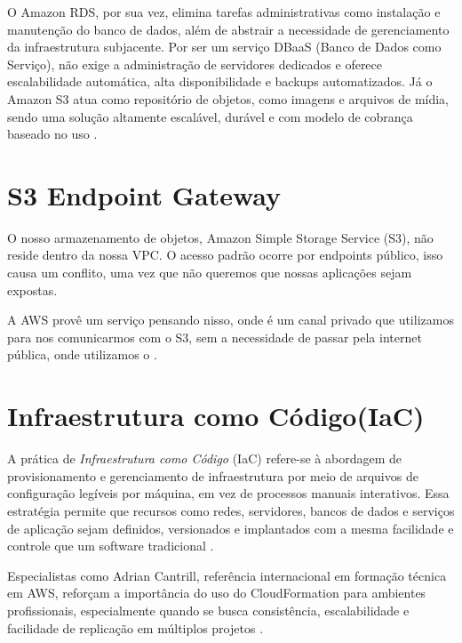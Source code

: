 O Amazon RDS, por sua vez, elimina tarefas administrativas como instalação e manutenção do banco de dados, além de abstrair a necessidade de gerenciamento da infraestrutura subjacente. Por ser um serviço DBaaS (Banco de Dados como Serviço), não exige a administração de servidores dedicados e oferece escalabilidade automática, alta disponibilidade e backups automatizados. Já o Amazon S3 atua como repositório de objetos, como imagens e arquivos de mídia, sendo uma solução altamente escalável, durável e com modelo de cobrança baseado no uso \cite{awsdocs2024}.

\section{S3 Endpoint Gateway}
O nosso armazenamento de objetos, Amazon Simple Storage Service (S3), não reside dentro da nossa VPC. O acesso padrão ocorre por endpoints público, isso causa um conflito, uma vez que não queremos que nossas aplicações sejam expostas.

A AWS provê um serviço pensando nisso, onde é um canal privado que utilizamos para nos comunicarmos com o S3, sem a necessidade de passar pela internet pública, onde utilizamos o \cite{awsendpoint}.
 

\section{Infraestrutura como Código(IaC)}A prática de \textit{Infraestrutura como Código} (IaC) refere-se à abordagem de provisionamento e gerenciamento de infraestrutura por meio de arquivos de configuração legíveis por máquina, em vez de processos manuais interativos. Essa estratégia permite que recursos como redes, servidores, bancos de dados e serviços de aplicação sejam definidos, versionados e implantados com a mesma facilidade e controle que um software tradicional \cite{microsoft2024iac}.

Especialistas como Adrian Cantrill, referência internacional em formação técnica em AWS, reforçam a importância do uso do CloudFormation para ambientes profissionais, especialmente quando se busca consistência, escalabilidade e facilidade de replicação em múltiplos projetos \cite{cantrill2023}.